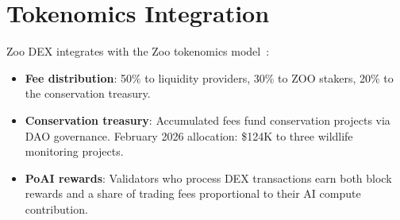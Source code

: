 \section{Tokenomics Integration}


Zoo DEX integrates with the Zoo tokenomics model~\cite{zoo-tokenomics}:

\begin{itemize}
    \item \textbf{Fee distribution}: 50\% to liquidity providers, 30\% to ZOO stakers, 20\% to the conservation treasury.

    \item \textbf{Conservation treasury}: Accumulated fees fund conservation projects via DAO governance. February 2026 allocation: \$124K to three wildlife monitoring projects.

    \item \textbf{PoAI rewards}: Validators who process DEX transactions earn both block rewards and a share of trading fees proportional to their AI compute contribution.
\end{itemize}

